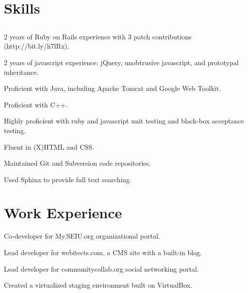 \documentclass{resume}
\begin{document}
\author{Dmitry Ratnikov}
\maketitle

\section{Skills}

\subsection{}

\begin{compactitem}
  \item 2 years of Ruby on Rails experience with 3 patch contributions (http://bit.ly/h7lRx).
  \item 2 years of javascript experience: jQuery, unobtrusive javascript, and prototypal inheritance.
  \item Proficient with Java, including Apache Tomcat and Google Web Toolkit.
  \item Proficient with C++.
  \\
  \item Highly proficient with ruby and javascript unit testing and black-box acceptance testing.
  \item Fluent in (X)HTML and CSS.
  \item Maintained Git and Subversion code repositories.
  \item Used Sphinx to provide full text searching.
\end{compactitem}

\section{Work Experience}

\begin{compactitem}
  \item Co-developer for My.SEIU.org organizational portal.
  \item Lead developer for webitects.com, a CMS site with a built-in blog.
  \item Lead developer for communitycollab.org social networking portal.
  \item Created a virtualized staging environment built on VirtualBox.
\end{compactitem}
\end{document}
